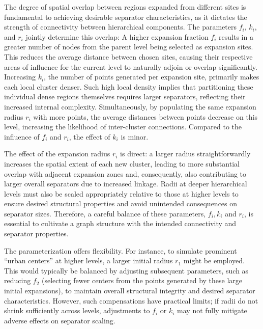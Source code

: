 The degree of spatial overlap between regions expanded from different sites is fundamental to achieving desirable separator characteristics, as it dictates the strength of connectivity between hierarchical components.
The parameters \(f_i\), \(k_i\), and \(r_i\) jointly determine this overlap:
A higher expansion fraction \(f_i\) results in a greater number of nodes from the parent level being selected as expansion sites.
This reduces the average distance between chosen sites, causing their respective areas of influence for the current level to naturally adjoin or overlap significantly.
Increasing \(k_i\), the number of points generated per expansion site, primarily makes each local cluster denser.
Such high local density implies that partitioning these individual dense regions themselves requires larger separators, reflecting their increased internal complexity.
Simultaneously, by populating the same expansion radius \(r_i\) with more points, the average distances between points decrease on this level, increasing the likelihood of inter-cluster connections.
Compared to the influence of \(f_i\) and \(r_i\), the effect of \(k_i\) is minor.

The effect of the expansion radius \(r_i\) is direct: a larger radius straightforwardly increases the spatial extent of each new cluster, leading to more substantial overlap with adjacent expansion zones and, consequently, also contributing to larger overall separators due to increased linkage.
Radii at deeper hierarchical levels must also be scaled appropriately relative to those at higher levels to ensure desired structural properties and avoid unintended consequences on separator sizes.
Therefore, a careful balance of these parameters, \(f_i, k_i\) and \(r_i\), is essential to cultivate a graph structure with the intended connectivity and separator properties.

The parameterization offers flexibility.
For instance, to simulate prominent \enquote{urban centers} at higher levels, a larger initial radius \(r_1\) might be employed.
This would typically be balanced by adjusting subsequent parameters, such as reducing \(f_2\) (selecting fewer centers from the points generated by these large initial expansions), to maintain overall structural integrity and desired separator characteristics.
However, such compensations have practical limits; if radii do not shrink sufficiently across levels, adjustments to \(f_i\) or \(k_i\) may not fully mitigate adverse effects on separator scaling.

